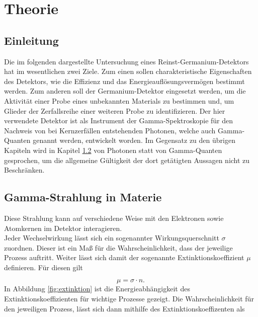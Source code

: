 \section{Theorie}
\label{sec:Theorie}

\subsection{Einleitung}
\label{subsec:Einleitung}

Die im folgenden dargestellte Untersuchung eines Reinst-Germanium-Detektors hat im wesentlichen zwei Ziele. 
Zum einen sollen charakteristische Eigenschaften des Detektors, wie die Effizienz und das Energieauflösungsvermögen bestimmt werden.
Zum anderen soll der Germanium-Detektor eingesetzt werden, um die Aktivität einer Probe eines unbekannten Materials zu bestimmen und, um Glieder der Zerfallsreihe einer weiteren Probe zu identifizieren.
Der hier verwendete Detektor ist als Instrument der Gamma-Spektroskopie für den Nachweis von bei Kernzerfällen entstehenden Photonen, welche auch Gamma-Quanten genannt werden, entwickelt worden. 
Im Gegensatz zu den übrigen Kapiteln wird in Kapitel \ref{subsec:t1} von Photonen statt von Gamma-Quanten gesprochen, um die allgemeine Gültigkeit der dort getätigten Aussagen nicht zu Beschränken.

\subsection{Gamma-Strahlung in Materie}
\label{subsec:t1}
Diese Strahlung kann auf verschiedene Weise mit den Elektronen sowie Atomkernen im Detektor
interagieren.\\
Jeder Wechselwirkung lässt sich ein sogenannter Wirkungsquerschnitt
$\sigma$ zuordnen. Dieser ist ein Maß für die Wahrscheinlichkeit,
dass der jeweilige Prozess auftritt. Weiter lässt sich damit der sogenannte Extinktionskoeffizient $\mu$ definieren.
Für diesen gilt

\begin{equation}
  \label{eqn:extinktion}
  \mu = \sigma \cdot n .
\end{equation}
In Abbildung \ref{fig:extinktion} ist die Energieabhängigkeit des Extinktionskoeffizienten für wichtige
Prozesse gezeigt.
Die Wahrscheinlichkeit für den jeweiligen Prozess, lässt sich dann mithilfe des Extinktionskoeffizenten als

